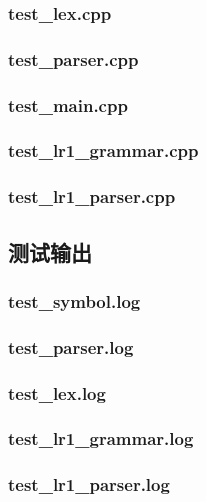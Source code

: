  \subsubsection{test\_lex.cpp}
 

 \subsubsection{test\_parser.cpp}
 

 \subsubsection{test\_main.cpp}
 

 \subsubsection{test\_lr1\_grammar.cpp}
 

 \subsubsection{test\_lr1\_parser.cpp}
 

 \subsection{测试输出}
 \subsubsection{test\_symbol.log}
 

 \subsubsection{test\_parser.log}
 

 \subsubsection{test\_lex.log}
 

 \subsubsection{test\_lr1\_grammar.log}
 

 \subsubsection{test\_lr1\_parser.log}
 
